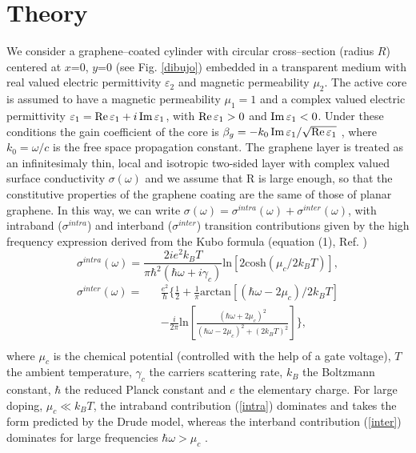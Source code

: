 \documentclass[9pt,twocolumn,twoside]{osajnl}
\begin{document}
\section{Theory}
\label{sec:theory}

We consider a graphene--coated cylinder with circular cross--section (radius $R$) centered at $x$=0, $y$=0 (see Fig. \ref{dibujo}) embedded in a transparent medium with real valued electric permittivity $\varepsilon_{2}$ and magnetic permeability $\mu_{2}$. 
The active core is assumed to have a magnetic permeability $\mu_{1}=1 $ and a complex valued electric permittivity 
$\varepsilon_{1}={\rm Re \mit} \,\varepsilon_1+ i\,{\rm Im \mit} \,\varepsilon_1$, with ${\rm Re \mit} \,\varepsilon_1>0$ and ${\rm Im \mit} \,\varepsilon_1<0$. Under these conditions the gain coefficient of the core is $\beta_g=-k_0 \,{\rm Im \mit} \,\varepsilon_1/\sqrt{{\rm Re \mit} \,\varepsilon_1}$ \cite{maier2006}, where $k_0=\omega/c$ is the free space propagation constant. 
%
The graphene layer is treated as an infinitesimaly thin, local and isotropic two-sided layer with complex valued surface conductivity $\sigma(\omega)$ and we assume that R is large enough, so that the constitutive properties of the graphene coating are the same of those of planar graphene. In this way, we can write 
$\sigma(\omega)=\sigma ^{intra}(\omega) +  \sigma^{inter}(\omega)$, with intraband ($\sigma ^{intra}$) and interband ($\sigma ^{inter}$) transition contributions given by the high frequency expression derived from the Kubo formula (equation (1), Ref. \cite{kubo1}) 
%
%
\begin{equation} \label{intra}
\sigma^{intra}(\omega)= \frac{2i e^2 k_B T}{\pi \hbar^2 (\hbar\omega+i\gamma_c)} \mbox{ln}\left[2 \mbox{cosh}(\mu_c/2 k_B T)\right],
\end{equation}  
%
\begin{eqnarray} \label{inter}
\sigma^{inter}(\omega)= && 
\frac{e^2}{\hbar} \bigg\{   \frac{1}{2}+\frac{1}{\pi}\mbox{arctan}\left[(\hbar\omega-2\mu_c)/2k_BT\right] \nonumber \\
&& -  \frac{i}{2\pi}\mbox{ln}\left[\frac{(\hbar\omega+2\mu_c)^2}{(\hbar\omega-2\mu_c)^2+(2k_BT)^2}\right] \bigg\}, \\ \nonumber 
\end{eqnarray}  
%
%
where $\mu_c$ is the chemical potential (controlled with the help of a gate voltage), $T$ the ambient temperature, $\gamma_c$ the carriers scattering rate, $k_B$ the Boltzmann constant, $\hbar$ the reduced Planck constant and $e$ the elementary charge. 
For large doping, $\mu_c\ll k_BT$, the intraband contribution (\ref{intra}) dominates and takes the form predicted by the Drude model, whereas the interband contribution (\ref{inter}) dominates for large frequencies $\hbar \omega > \mu_c$ \cite{kubo1,kubo2}. 
\end{document}
